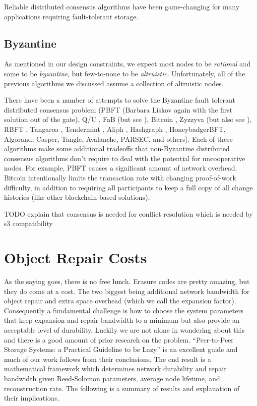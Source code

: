 \documentclass[11pt,fleqn,openany]{book}
\newcommand{\todo}[1]{{\color{red} TODO #1 }}
\begin{document}
Reliable distributed consensus algorithms have been game-changing for many
applications requiring fault-tolerant storage.

\section{Byzantine}

As mentioned in our design constraints, we expect most nodes to be {\em
rational} and some to be {\em byzantine}, but few-to-none to be {\em
altruistic}. Unfortunately, all of the previous algorithms we discussed assume a
collection of altruistic nodes.

There have been a number of attempts to solve the Byzantine fault tolerant
distributed consensus problem
(PBFT \cite{pbft} (Barbara Liskov again with the
first solution out of the gate), Q/U \cite{qu}, FaB \cite{fab} (but see
\cite{fab-revisited}), Bitcoin \cite{bitcoin}, Zyzzyva \cite{zyzzyva} (but also
see \cite{fab-revisited}), RBFT \cite{rbft}, Tangaroa \cite{tangaroa},
Tendermint \cite{tendermint}, Aliph \cite{aliph}, Hashgraph \cite{hashgraph},
HoneybadgerBFT\cite{honeybadger}, Algorand\cite{algorand}, Casper\cite{casper},
Tangle\cite{tangle}, Avalanche\cite{avalanche}, PARSEC\cite{parsec}, and
others\cite{mickens-bft}).
Each of these algorithms make some
additional tradeoffs that non-Byzantine distributed consensus algorithms don't
require to deal with the potential for uncooperative nodes. For example,
PBFT \cite{pbft} causes a significant amount of network overhead. Bitcoin
\cite{bitcoin} intentionally limits the transaction rate with changing
proof-of-work difficulty, in addition to requiring all participants to keep a
full copy of all change histories (like other blockchain-based
solutions).

\todo{explain that consensus is needed for conflict resolution which is needed
by s3 compatibility}

\chapter{Object Repair Costs}

	As the saying goes, there is no free lunch. Erasure codes are pretty amazing, but they do come at a cost. The two biggest being additional network bandwidth for object repair and extra space overhead (which we call the expansion factor). Consequently a fundamental challenge is how to choose the system parameters that keep expansion and repair bandwidth to a minimum but also provide an acceptable level of durability. Luckily we are not alone in wondering about this and there is a good amount of prior research on the problem. ``Peer-to-Peer Storage Systems: a Practical Guideline to be Lazy'' \cite{p2p-lazy} is an excellent guide and much of our work follows from their conclusions. The end result is a mathematical framework which determines network durability and repair bandwidth given Reed-Solomon parameters, average node lifetime, and reconstruction rate. The following is a summary of results and explanation of their implications.
\end{document}
